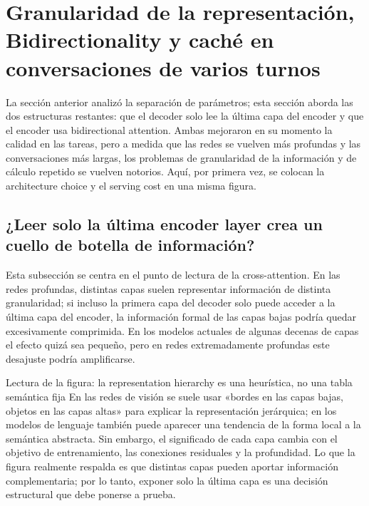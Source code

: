 \section{Granularidad de la representación, Bidirectionality y caché en conversaciones de varios turnos}

La sección anterior analizó la separación de parámetros; esta sección aborda las dos estructuras restantes: que el decoder solo lee la última capa del encoder y que el encoder usa bidirectional attention. Ambas mejoraron en su momento la calidad en las tareas, pero a medida que las redes se vuelven más profundas y las conversaciones más largas, los problemas de granularidad de la información y de cálculo repetido se vuelven notorios. Aquí, por primera vez, se colocan la architecture choice y el serving cost en una misma figura.

\subsection{¿Leer solo la última encoder layer crea un cuello de botella de información?}

Esta subsección se centra en el punto de lectura de la cross-attention. En las redes profundas, distintas capas suelen representar información de distinta granularidad; si incluso la primera capa del decoder solo puede acceder a la última capa del encoder, la información formal de las capas bajas podría quedar excesivamente comprimida. En los modelos actuales de algunas decenas de capas el efecto quizá sea pequeño, pero en redes extremadamente profundas este desajuste podría amplificarse.




\begin{knowledgebox}{Lectura de la figura: la representation hierarchy es una heurística, no una tabla semántica fija}
En las redes de visión se suele usar «bordes en las capas bajas, objetos en las capas altas» para explicar la representación jerárquica; en los modelos de lenguaje también puede aparecer una tendencia de la forma local a la semántica abstracta. Sin embargo, el significado de cada capa cambia con el objetivo de entrenamiento, las conexiones residuales y la profundidad. Lo que la figura realmente respalda es que distintas capas pueden aportar información complementaria; por lo tanto, exponer solo la última capa es una decisión estructural que debe ponerse a prueba.
\end{knowledgebox}

